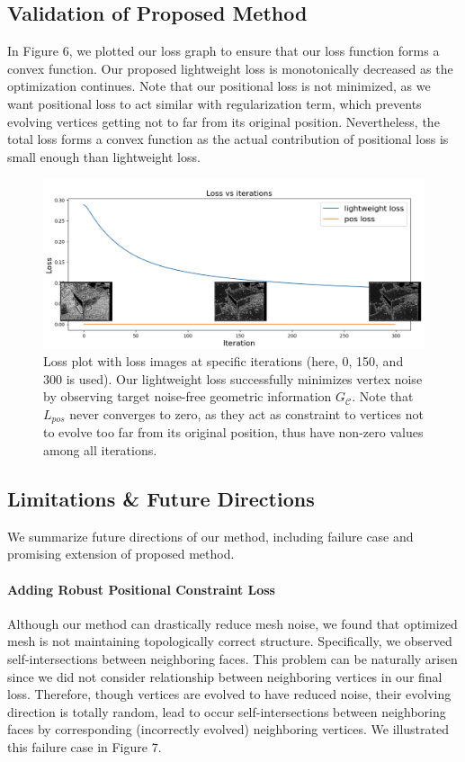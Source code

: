 \subsection{Validation of Proposed Method}
In Figure 6, we plotted our loss graph to ensure that our loss function forms a convex function. 
Our proposed lightweight loss is monotonically decreased as the optimization continues. 
Note that our positional loss is not minimized, as we want positional loss to act similar with regularization term, which prevents evolving vertices getting not to far from its original position. 
Nevertheless, the total loss forms a convex function as the actual contribution of positional loss is small enough than lightweight loss. 

\begin{figure}
    \includegraphics[width=\columnwidth]{figures/4_result_loss_plot_with_images.png}
    \caption{Loss plot with loss images at specific iterations (here, 0, 150, and 300 is used). Our lightweight loss successfully minimizes vertex noise by observing target noise-free geometric information $G_\mathcal{C}$. Note that $L_{pos}$ never converges to zero, as they act as constraint to vertices not to evolve too far from its original position, thus have non-zero values among all iterations.}
    \label{fig:loss_plot_with_images}
\end{figure}

\subsection{Limitations \& Future Directions}
We summarize future directions of our method, including failure case and promising extension of proposed method.

\paragraph{Adding Robust Positional Constraint Loss}
Although our method can drastically reduce mesh noise, we found that optimized mesh is not maintaining topologically correct structure. 
Specifically, we observed self-intersections between neighboring faces. 
This problem can be naturally arisen since we did not consider relationship between neighboring vertices in our final loss. 
Therefore, though vertices are evolved to have reduced noise, their evolving direction is totally random, lead to occur self-intersections between neighboring faces by corresponding (incorrectly evolved) neighboring vertices. 
We illustrated this failure case in Figure 7.


